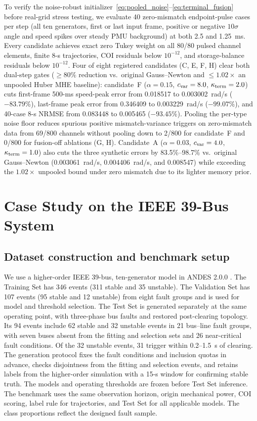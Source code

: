 \documentclass[journal]{IEEEtran}
\begin{document}
To verify the noise-robust initializer~\eqref{eq:pooled_noise}--\eqref{eq:terminal_fusion}
before real-grid stress testing, we evaluate 40 zero-mismatch endpoint-pulse
cases per step (all ten generators, first or last input frame, positive or
negative \(10\sigma\) angle and speed spikes over steady PMU background) at
both 2.5 and 1.25~ms. Every candidate achieves exact zero Tukey weight on all
80/80 pulsed channel elements, finite 8-s trajectories, COI residuals below
\(10^{-12}\), and storage-balance residuals below \(10^{-12}\). Four of eight
registered candidates (C, E, F, H) clear both dual-step gates (\(\ge80\%\)
reduction vs.\ original Gauss--Newton and \(\le1.02\times\) an unpooled Huber
MHE baseline): candidate~F (\(\alpha=0.15\), \(c_{\rm var}=8.0\),
\(\kappa_{\rm term}=2.0\)) cuts first-frame 500-ms speed-peak error from
0.018517 to 0.003002~rad/s (\(-83.79\%\)), last-frame peak error from
0.346409 to 0.003229~rad/s (\(-99.07\%\)), and 40-case 8-s NRMSE from
0.083448 to 0.005465 (\(-93.45\%\)). Pooling the per-type noise floor
reduces spurious positive mismatch-variance triggers on zero-mismatch data
from 69/800 channels without pooling down to 2/800 for candidate~F and 0/800
for fusion-off ablations (G, H). Candidate~A (\(\alpha=0.03\),
\(c_{\rm var}=4.0\), \(\kappa_{\rm term}=1.0\)) also cuts the three synthetic
errors by 83.5\%--98.7\% vs.\ original Gauss--Newton (0.003061~rad/s,
0.004406~rad/s, and 0.008547) while exceeding the \(1.02\times\) unpooled
bound under zero mismatch due to its lighter memory prior.

\section{Case Study on the IEEE 39-Bus System}
\label{sec:ieee39}
\subsection{Dataset construction and benchmark setup}
We use a higher-order IEEE 39-bus, ten-generator model in ANDES 2.0.0
\cite{cui2021andes}. The Training Set has 346 events (311 stable and
35 unstable). The Validation Set has 107 events (95 stable and
12 unstable) from eight fault groups and is used for model and threshold
selection. The Test Set is generated separately at the same operating
point, with three-phase bus faults and restored post-clearing topology.
Its 94 events include 62 stable and 32 unstable events in 21 bus--line fault
groups, with seven buses absent from the fitting and selection sets and 26
near-critical fault conditions. Of the 32 unstable events, 31 trigger
within 0.2--1.5~s of clearing. The generation protocol fixes the fault
conditions and inclusion quotas in advance, checks disjointness from the
fitting and selection events, and retains labels from the higher-order
simulation with a 15-s window for confirming stable truth.
The models and operating thresholds are frozen before Test Set inference.
The benchmark uses the same observation horizon, origin mechanical power,
COI scoring, label rule for trajectories, and Test Set for all applicable
models. The class proportions reflect the designed fault sample.
\end{document}
